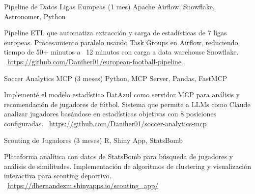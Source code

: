 \documentclass[]{awesome-cv}
\begin{document}
\begin{cventries}
	\vspace{-3mm}
	\cventry
	{}
	{Pipeline de Datos Ligas Europeas (1 mes) \vspace{-5mm}}
	{Apache Airflow, Snowflake, Astronomer, Python \vspace{-5mm}}
	{}
	{\begin{cvsectionnormaltext}
		\item {Pipeline ETL que automatiza extracción y carga de estadísticas de 7 ligas europeas. Procesamiento paralelo usando Task Groups en Airflow, reduciendo tiempo de 50+ minutos a ~12 minutos con carga a data warehouse Snowflake.
		\newline \faLink\ \href{https://github.com/Daniher01/european-football-pipeline}{https://github.com/Daniher01/european-football-pipeline}}
	\end{cvsectionnormaltext}}

	\vspace{-3mm}
	\cventry
	{}
	{Soccer Analytics MCP (3 meses) \vspace{-5mm}}
	{Python, MCP Server, Pandas, FastMCP \vspace{-5mm}}
	{}
	{\begin{cvsectionnormaltext}
		\item {Implementé el modelo estadístico DatAzul como servidor MCP para análisis y recomendación de jugadores de fútbol. Sistema que permite a LLMs como Claude analizar jugadores basándose en estadísticas objetivas con 8 posiciones configuradas.
		\newline \faLink\ \href{https://github.com/Daniher01/soccer-analytics-mcp}{https://github.com/Daniher01/soccer-analytics-mcp}}
	\end{cvsectionnormaltext}}

	\vspace{-3mm}
	\cventry
	{}
	{Scouting de Jugadores (3 meses) \vspace{-5mm}}
	{R, Shiny App, StatsBomb \vspace{-5mm}}
	{}
	{\begin{cvsectionnormaltext}
		\item {Plataforma analítica con datos de StatsBomb para búsqueda de jugadores y análisis de similitudes. Implementación de algoritmos de clustering y visualización interactiva para scouting deportivo.
		\newline \faLink\ \href{https://dhernandezm.shinyapps.io/scouting_app/}{https://dhernandezm.shinyapps.io/scouting\_app/}}
	\end{cvsectionnormaltext}}


\end{cventries}
\end{document}
